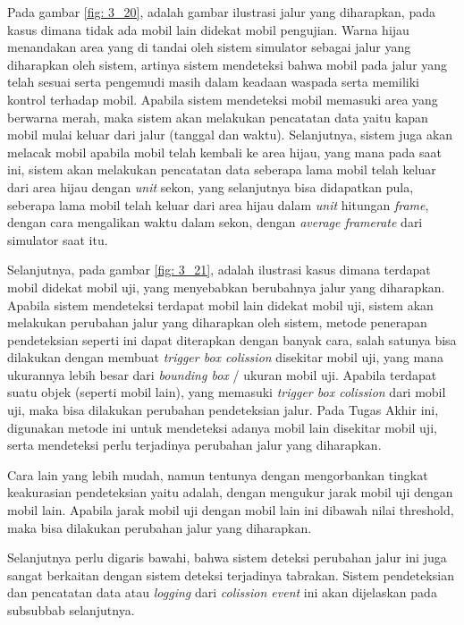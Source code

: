         Pada gambar \ref{fig: 3_20}, adalah gambar ilustrasi jalur yang diharapkan, pada kasus dimana tidak ada mobil lain didekat mobil pengujian. Warna hijau menandakan area yang di tandai oleh sistem simulator sebagai jalur yang diharapkan oleh sistem, artinya sistem mendeteksi bahwa mobil pada jalur yang telah sesuai serta pengemudi masih dalam keadaan waspada serta memiliki kontrol terhadap mobil. Apabila sistem mendeteksi mobil memasuki area yang berwarna merah, maka sistem akan melakukan pencatatan data yaitu kapan mobil mulai keluar dari jalur (tanggal dan waktu). Selanjutnya, sistem juga akan melacak mobil apabila mobil telah kembali ke area hijau, yang mana pada saat ini, sistem akan melakukan pencatatan data seberapa lama mobil telah keluar dari area hijau dengan \textit{unit} sekon, yang selanjutnya bisa didapatkan pula, seberapa lama mobil telah keluar dari area hijau dalam \textit{unit} hitungan \textit{frame}, dengan cara mengalikan waktu dalam sekon, dengan \textit{average framerate} dari simulator saat itu.
        
        \par Selanjutnya, pada gambar \ref{fig: 3_21}, adalah ilustrasi kasus dimana terdapat mobil didekat mobil uji, yang menyebabkan berubahnya jalur yang diharapkan. Apabila sistem mendeteksi terdapat mobil lain didekat mobil uji, sistem akan melakukan perubahan jalur yang diharapkan oleh sistem, metode penerapan pendeteksian seperti ini dapat diterapkan dengan banyak cara, salah satunya bisa dilakukan dengan membuat \textit{trigger box colission} disekitar mobil uji, yang mana ukurannya lebih besar dari \textit{bounding box} / ukuran mobil uji. Apabila terdapat suatu objek (seperti mobil lain), yang memasuki \textit{trigger box colission} dari mobil uji, maka bisa dilakukan perubahan pendeteksian jalur. Pada Tugas Akhir ini, digunakan metode ini untuk mendeteksi adanya mobil lain disekitar mobil uji, serta mendeteksi perlu terjadinya perubahan jalur yang diharapkan.
        
        \par Cara lain yang lebih mudah, namun tentunya dengan mengorbankan tingkat keakurasian pendeteksian yaitu adalah, dengan mengukur jarak mobil uji dengan mobil lain. Apabila jarak mobil uji dengan mobil lain ini dibawah nilai threshold, maka bisa dilakukan perubahan jalur yang diharapkan.
        
        \par Selanjutnya perlu digaris bawahi, bahwa sistem deteksi perubahan jalur ini juga sangat berkaitan dengan sistem deteksi terjadinya tabrakan. Sistem pendeteksian dan pencatatan data atau \textit{logging} dari \textit{colission event} ini akan dijelaskan pada subsubbab selanjutnya.
        
